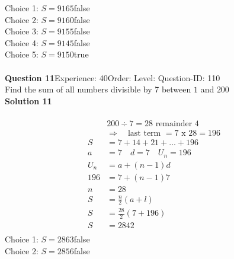 \documentclass{article}
\begin{document}
Choice 1: \hspace{20pt}$S=9165$\hspace{20pt}false\\
Choice 2: \hspace{20pt}$S=9160$\hspace{20pt}false\\
Choice 3: \hspace{20pt}$S=9155$\hspace{20pt}false\\
Choice 4: \hspace{20pt}$S=9145$\hspace{20pt}false\\
Choice 5: \hspace{20pt}$S=9150$\hspace{20pt}true\\
\\[4pt]
\noindent\textbf{Question 11}\hspace{20pt}Experience: 40\hspace{20pt}Order: \hspace{20pt}Level: \hspace{20pt}Question-ID: 110\\[2pt]
Find the sum of all numbers divisible by 7 between $1$ and $200$\\[4pt]
\noindent\textbf{Solution 11}\\[2pt]
\\[-35pt]\begin{align*}
&200 \div 7 = 28 \,\, \text{remainder}\,\, 4\\[2pt]
&\Rightarrow \quad \text{last term }= 7 \,\,\text{x}\,\, 28=196\\[2pt]
S&=7+14+21+...+196\\[12pt]
a&=7\quad d=7 \quad U_n=196\\[2pt]
U_n&=a+(n-1)d\\[2pt]
196&=7+(n-1)7\\[2pt]
n&=28\\[12pt]
S&=\displaystyle\frac{n}{2}(a+l)\\[2pt]
S&=\displaystyle\frac{28}{2}(7+196)\\[2pt]
S&=2842\\[-140pt]
\end{align*}
Choice 1: \hspace{20pt}$S=2863$\hspace{20pt}false\\
Choice 2: \hspace{20pt}$S=2856$\hspace{20pt}false\\
\end{document}
